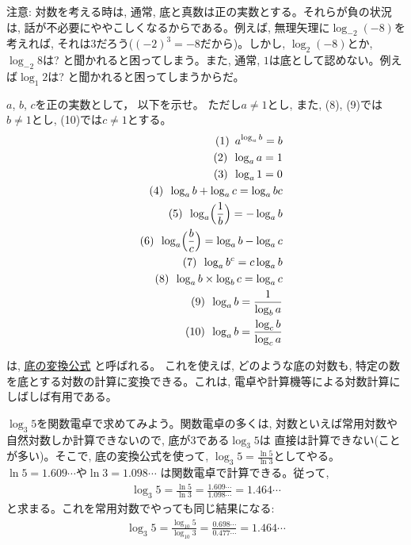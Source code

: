 注意: 対数を考える時は, 通常, 底と真数は正の実数とする。それらが負の状況は, 話が不必要にややこしくなるからである。例えば, 無理矢理に$\log_{-2}(-8)$を考えれば, それは3だろう($(-2)^3=-8$だから)。しかし, $\log_{2}(-8)$とか, $\log_{-2}8$は? と聞かれると困ってしまう。また, 通常, $1$は底として認めない。例えば$\log_{1}2$は? と聞かれると困ってしまうからだ。\mv

\begin{q}\label{q:exp_log0} $a$, $b$, $c$を正の実数として， 以下を示せ。
ただし$a \neq 1$とし, また, (8), (9)では$b \neq 1$とし, (10)では$c\neq 1$とする。
\begin{eqnarray}
&&\text{(1)}\,\,\,a^{\log_{a}b}=b\label{eq:apowlogab}\\
&&\text{(2)}\,\,\,\log_{a}a=1\\
&&\text{(3)}\,\,\,\log_{a}1=0\\
&&\text{(4)}\,\,\,\log_{a}b+\log_{a}c=\log_{a}bc\\
&&\text{(5)}\,\,\,\log_{a}\Bigl(\frac{1}{b}\Bigr)=-\log_{a}b\\
&&\text{(6)}\,\,\,\log_{a}\Bigl(\frac{b}{c}\Bigr)=\log_{a}b-\log_{a}c\label{eq:exp_log_formula6}\\
&&\text{(7)}\,\,\,\log_{a}b^c=c\log_{a}b\label{eq:log_power}\\
&&\text{(8)}\,\,\,\log_{a}b\times\log_{b}c=\log_{a}c\label{eq:logloglog}\\
&&\text{(9)}\,\,\,\log_{a}b=\frac{1}{\log_{b}a}\\
&&\text{(10)}\,\,\,\log_{a}b=\frac{\log_c b}{\log_c a}\label{eq:log_base_change}
\end{eqnarray}\end{q}
\hv

は, \underline{底の変換公式} と呼ばれる。
これを使えば, どのような底の対数も, 特定の数を底とする対数の計算に変換できる。これは, 
電卓や計算機等による対数計算にしばしば有用である。\hv

\begin{exmpl} $\log_3 5$を関数電卓で求めてみよう。関数電卓の多くは, 
対数といえば常用対数や自然対数しか計算できないので, 底が3である$\log_3 5$は
直接は計算できない(ことが多い)。そこで, 底の変換公式を使って, 
$\log_3 5=\frac{\ln 5}{\ln 3}$としてやる。$\ln 5=1.609\cdots$や$\ln 3=1.098\cdots$
は関数電卓で計算できる。従って, 
\begin{eqnarray}
\log_3 5=\frac{\ln 5}{\ln 3}=\frac{1.609\cdots}{1.098\cdots}=1.464\cdots
\end{eqnarray}
と求まる。これを常用対数でやっても同じ結果になる: 
\begin{eqnarray}
\log_3 5=\frac{\log_{10} 5}{\log_{10} 3}=\frac{0.698\cdots}{0.477\cdots}=1.464\cdots
\end{eqnarray}
\end{exmpl}
\mv

